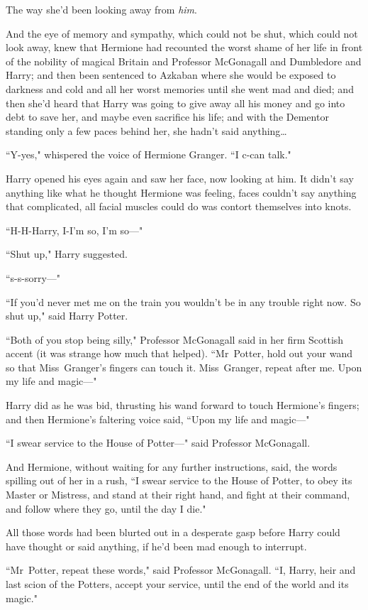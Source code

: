 The way she'd been looking away from \emph{him}.

And the eye of memory and sympathy, which could not be shut, which could not look away, knew that Hermione had recounted the worst shame of her life in front of the nobility of magical Britain and Professor McGonagall and Dumbledore and Harry; and then been sentenced to Azkaban where she would be exposed to darkness and cold and all her worst memories until she went mad and died; and then she'd heard that Harry was going to give away all his money and go into debt to save her, and maybe even sacrifice his life; and with the Dementor standing only a few paces behind her, she hadn't said anything{\ldots}

``Y-yes," whispered the voice of Hermione Granger. ``I c-can talk."

Harry opened his eyes again and saw her face, now looking at him. It didn't say anything like what he thought Hermione was feeling, faces couldn't say anything that complicated, all facial muscles could do was contort themselves into knots.

``H-H-Harry, I-I'm so, I'm so—"

``Shut up," Harry suggested.

``s-s-sorry—"

``If you'd never met me on the train you wouldn't be in any trouble right now. So shut up," said Harry Potter.

``Both of you stop being silly," Professor McGonagall said in her firm Scottish accent (it was strange how much that helped). ``Mr~Potter, hold out your wand so that Miss~Granger's fingers can touch it. Miss~Granger, repeat after me. Upon my life and magic—"

Harry did as he was bid, thrusting his wand forward to touch Hermione's fingers; and then Hermione's faltering voice said, ``Upon my life and magic—"

``I swear service to the House of Potter—" said Professor McGonagall.

And Hermione, without waiting for any further instructions, said, the words spilling out of her in a rush, ``I swear service to the House of Potter, to obey its Master or Mistress, and stand at their right hand, and fight at their command, and follow where they go, until the day I die."

All those words had been blurted out in a desperate gasp before Harry could have thought or said anything, if he'd been mad enough to interrupt.

``Mr~Potter, repeat these words," said Professor McGonagall. ``I, Harry, heir and last scion of the Potters, accept your service, until the end of the world and its magic."

